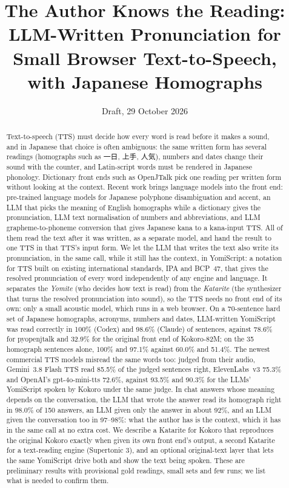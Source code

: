 \documentclass[11pt,a4paper]{article}
\title{The Author Knows the Reading:\\
LLM-Written Pronunciation for Small Browser Text-to-Speech, with Japanese Homographs}
\author{\todo{authors and affiliations}}
\date{Draft, 29 October 2026}
\begin{document}
\maketitle

\begin{abstract}
Text-to-speech (TTS) must decide how every word is read before it makes a sound, and in Japanese that choice is often
ambiguous: the same written form has several readings (homographs such as 一日, 上手, 人気), numbers and dates change
their sound with the counter, and Latin-script words must be rendered in Japanese phonology. Dictionary front ends
such as OpenJTalk pick one reading per written form without looking at the context. Recent work brings language models
into the front end: pre-trained language models for Japanese polyphone disambiguation and
accent, an LLM that picks the meaning of English homographs while a dictionary gives the pronunciation, LLM text
normalisation of numbers and abbreviations, and LLM grapheme-to-phoneme conversion that gives Japanese kana to a
kana-input TTS. All of them read the text after it was written, as a separate model, and hand the result to one TTS in
that TTS's input form. We let the LLM that writes the text also write its pronunciation, in the same call, while it
still has the context, in YomiScript: a notation for TTS built on existing international standards, IPA and BCP~47,
that gives the resolved pronunciation of every word independently of any engine and language. It separates the
\emph{Yomite} (who decides how text is read) from the \emph{Katarite} (the synthesizer that turns the resolved
pronunciation into sound), so the TTS needs no front end of its own: only a small acoustic model, which runs in a web
browser. On a 70-sentence hard set of Japanese homographs, acronyms, numbers and dates, LLM-written YomiScript was read
correctly in 100\% (Codex) and 98.6\% (Claude) of sentences, against 78.6\% for pyopenjtalk and 32.9\% for the
original front end of Kokoro-82M; on the 35 homograph sentences alone, 100\% and 97.1\% against 60.0\% and 51.4\%.
The newest commercial TTS models misread the same words too: judged from their audio, Gemini~3.8 Flash TTS read
85.5\% of the judged sentences right, ElevenLabs~v3 75.3\% and OpenAI's gpt-4o-mini-tts 72.6\%, against 93.5\% and
90.3\% for the LLMs' YomiScript spoken by Kokoro under the same judge. In chat answers whose meaning depends on the
conversation, the LLM that wrote the answer read its homograph right in 98.0\% of 150 answers, an LLM given only the
answer in about 92\%, and an LLM given the conversation too in 97--98\%: what the author has is the context, which it
has in the same call at no extra cost. We describe a Katarite for Kokoro that reproduces the original Kokoro exactly
when given its own front end's output, a second Katarite for a text-reading engine (Supertonic 3), and an optional
original-text layer that lets the same YomiScript drive both and show the text being spoken. These are preliminary
results with provisional gold readings, small sets and few runs; we list what is needed to confirm them.
\end{abstract}
\end{document}
